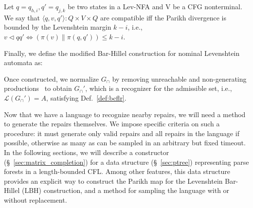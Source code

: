 \documentclass[sigplan,review,acmsmall,nonacm,anonymous]{acmart}\settopmatter{printfolios=false,printccs=false,printacmref=false}
\begin{document}
  \begin{definition}
    Let $q = q_{h,i}, q'=q_{j,k}$ be two states in a Lev-NFA and V be a CFG nonterminal. We say that $\langle q, v, q'\rangle: Q\times V\times Q$ are compatible iff the Parikh divergence is bounded by the Levenshtein margin $k-i$, i.e., $v \lhd qq' \iff (\pi(v) \parallel \pi(q, q')) \leq k-i$.
  \end{definition}

  Finally, we define the modified Bar-Hillel construction for nominal Levenshtein automata as:\vspace{-2pt}

  \vspace{2pt}

  \noindent Once constructed, we normalize $G_\cap$ by removing unreachable and non-generating productions~\cite{firsov2015certified} to obtain $G_\cap'$, which is a recognizer for the admissible set, i.e., $\mathcal{L}(G_\cap') = A$, satisfying Def.~\ref{def:bcflr}.



  Now that we have a language to recognize nearby repairs, we will need a method to generate the repairs themselves. We impose specific criteria on such a procedure: it must generate only valid repairs and all repairs in the language if possible, otherwise as many as can be sampled in an arbitrary but fixed timeout. In the following sections, we will describe a constructor (\S~\ref{sec:matrix_completion}) for a data structure (\S~\ref{sec:ptree}) representing parse forests in a length-bounded CFL. Among other features, this data structure provides an explicit way to construct the Parikh map for the Levenshtein Bar-Hillel (LBH) construction, and a method for sampling the language with or without replacement.
\end{document}
